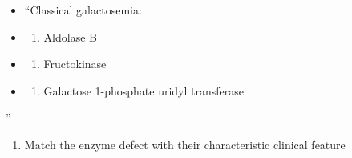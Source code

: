 \documentclass[
]{book}
\providecommand{\tightlist}{%
  \setlength{\itemsep}{0pt}\setlength{\parskip}{0pt}}
\begin{document}
\begin{itemize}
\item
  ``Classical galactosemia:
\item
  \begin{enumerate}
  \def\labelenumi{(\Alph{enumi})}
  \tightlist
  \item
    Aldolase B\\
  \end{enumerate}
\item
  \begin{enumerate}
  \def\labelenumi{(\Alph{enumi})}
  \setcounter{enumi}{1}
  \tightlist
  \item
    Fructokinase\\
  \end{enumerate}
\item
  \begin{enumerate}
  \def\labelenumi{(\Alph{enumi})}
  \setcounter{enumi}{2}
  \tightlist
  \item
    Galactose 1-phosphate uridyl transferase
  \end{enumerate}
\end{itemize}

''

\begin{enumerate}
\def\labelenumi{\arabic{enumi}.}
\setcounter{enumi}{1}
\tightlist
\item
  Match the enzyme defect with their characteristic clinical feature
\end{enumerate}
\end{document}
